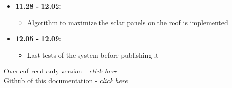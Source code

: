 \documentclass[a4paper,12pt,fleqn]{article}
\begin{document}
\begin{itemize}
    \item \textbf{11.28 - 12.02:}
    \begin{itemize}
        \item Algorithm to maximize the solar panels on the roof is implemented
    \end{itemize}
    
    \item \textbf{12.05 - 12.09:}
    \begin{itemize}
        \item Last tests of the system before publishing it
    \end{itemize}
\end{itemize}
Overleaf read only version - \textit{\href{https://www.overleaf.com/read/yfwwkrcvhxfk}{click here}}\\
Github of this documentation - \textit{\href{https://github.com/Jamtit/Documentation-Team3}{click here}}
\end{document}
